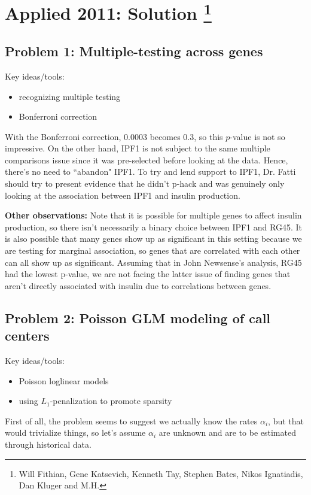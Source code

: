 \section{Applied 2011: Solution \footnote{Will Fithian, Gene Katsevich, Kenneth Tay, Stephen Bates, Nikos Ignatiadis, Dan Kluger and M.H.}}

\subsection*{Problem 1: Multiple-testing across genes}
Key ideas/tools:
\begin{itemize}
  \item recognizing multiple testing
  \item Bonferroni correction
\end{itemize}


With the Bonferroni correction, $0.0003$ becomes $0.3$, so this $p$-value is not so impressive.  On the other hand, IPF1 is not subject to the same multiple comparisons issue since it was pre-selected before looking at the data. Hence, there's no need to ``abandon" IPF1. To try and lend support to IPF1, Dr. Fatti should try to present evidence that he didn't p-hack and was genuinely only looking at the association between IPF1 and insulin production.

\textbf{Other observations:} Note that it is possible for multiple genes to affect insulin production, so there isn't necessarily a binary choice between IPF1 and RG45. It is also possible that many genes show up as significant in this setting because we are testing for marginal association, so genes that are correlated with each other can all show up as significant. Assuming that in John Newsense's analysis, RG45 had the lowest p-value, we are not facing the latter issue of finding genes that aren't directly associated with insulin due to correlations between genes.

\subsection*{Problem 2: Poisson GLM modeling of call centers}
Key ideas/tools:
\begin{itemize}
  \item Poisson loglinear models
  \item using $L_1$-penalization to promote sparsity
\end{itemize}

First of all, the problem seems to suggest we actually know the rates $\alpha_i$, but that would trivialize things, so let's assume $\alpha_i$ are unknown and are to be estimated through historical data.

